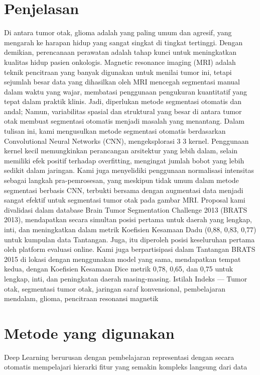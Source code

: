 \begin{enumerate}
\section{Penjelasan}
Di antara tumor otak, glioma adalah yang paling umum dan agresif, yang mengarah ke harapan hidup yang sangat singkat di tingkat tertinggi. Dengan demikian, perencanaan perawatan adalah tahap kunci untuk meningkatkan kualitas hidup pasien onkologis. Magnetic resonance imaging (MRI) adalah teknik pencitraan yang banyak digunakan untuk menilai tumor ini, tetapi sejumlah besar data yang dihasilkan oleh MRI mencegah segmentasi manual dalam waktu yang wajar, membatasi penggunaan pengukuran kuantitatif yang tepat dalam praktik klinis. Jadi, diperlukan metode segmentasi otomatis dan andal; Namun, variabilitas spasial dan struktural yang besar di antara tumor otak membuat segmentasi otomatis menjadi masalah yang menantang. Dalam tulisan ini, kami mengusulkan metode segmentasi otomatis berdasarkan Convolutional Neural Networks (CNN), mengeksplorasi 3 3 kernel. Penggunaan kernel kecil memungkinkan perancangan arsitektur yang lebih dalam, selain memiliki efek positif terhadap overfitting, mengingat jumlah bobot yang lebih sedikit dalam jaringan. Kami juga menyelidiki penggunaan normalisasi intensitas sebagai langkah pra-pemrosesan, yang meskipun tidak umum dalam metode segmentasi berbasis CNN, terbukti bersama dengan augmentasi data menjadi sangat efektif untuk segmentasi tumor otak pada gambar MRI. Proposal kami divalidasi dalam database Brain Tumor Segmentation Challenge 2013 (BRATS
2013), mendapatkan secara simultan posisi pertama untuk daerah yang lengkap, inti, dan meningkatkan dalam metrik Koefisien Kesamaan Dadu (0,88, 0,83, 0,77) untuk kumpulan data Tantangan. Juga, itu diperoleh
posisi keseluruhan pertama oleh platform evaluasi online. Kami juga
berpartisipasi dalam Tantangan BRATS 2015 di lokasi dengan menggunakan model yang sama, mendapatkan tempat kedua, dengan Koefisien Kesamaan Dice
metrik 0,78, 0,65, dan 0,75 untuk lengkap, inti, dan peningkatan
daerah masing-masing.
Istilah Indeks — Tumor otak, segmentasi tumor otak, jaringan saraf konvensional, pembelajaran mendalam, glioma, pencitraan resonansi magnetik
\section{Metode yang digunakan}
 Deep Learning berurusan dengan pembelajaran representasi dengan secara otomatis mempelajari hierarki fitur yang semakin kompleks langsung dari data

\end{enumerate}
